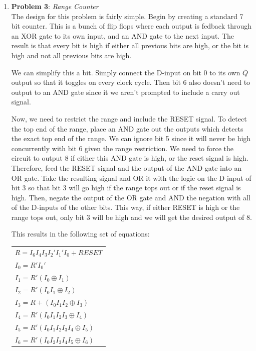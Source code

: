 \documentclass{article}
\begin{document}
\begin{enumerate}
        \item \textbf{Problem 3}: \emph{Range Counter} \\
        
        The design for this problem is fairly simple. Begin by creating a
        standard 7 bit counter. This is a bunch of flip flops where each output
        is fedback through an XOR gate to its own input, and an AND gate to the
        next input. The result is that every bit is high if either all previous
        bits are high, or the bit is high and not all previous bits are high.

        We can simplify this a bit. Simply connect the D-input on bit 0 to its
        own $\overline{Q}$ output so that it toggles on every clock cycle. Then
        bit 6 also doesn't need to output to an AND gate since it we aren't
        prompted to include a carry out signal. 

        Now, we need to restrict the range and include the RESET signal. To
        detect the top end of the range, place an AND gate out the outputs which
        detects the exact top end of the range. We can ignore bit 5 since it will
        never be high concurrently with bit 6 given the range restriction. We
        need to force the circuit to output 8 if either this AND gate is high,
        or the reset signal is high. Therefore, feed the RESET signal and the
        output of the AND gate into an OR gate. Take the resulting signal and
        OR it with the logic on the D-input of bit 3 so that bit 3 will go high
        if the range tops out or if the reset signal is high. Then, negate the 
        output of the OR gate and AND the negation with all of the D-inputs of 
        the other bits. This way, if either RESET is high or the range tops out,
        only bit 3 will be high and we will get the desired output of 8.

        This results in the following set of equations:

        \begin{tabular}{|l|}
            \hline
            $R = I_6I_4I_3I_2'I_1'I_0 + RESET$ \\
            $I_0 = R'I_0'$ \\
            $I_1 = R'(I_0 \oplus I_1)$ \\
            $I_2 = R'(I_0I_1 \oplus I_2)$ \\
            $I_3 = R + (I_0I_1I_2 \oplus I_3)$ \\
            $I_4 = R'(I_0I_1I_2I_3 \oplus I_4)$ \\
            $I_5 = R'(I_0I_1I_2I_3I_4 \oplus I_5)$ \\
            $I_6 = R'(I_0I_2I_3I_4I_5 \oplus I_6)$ \\
            \hline
        \end{tabular}


\end{enumerate}
\end{document}
